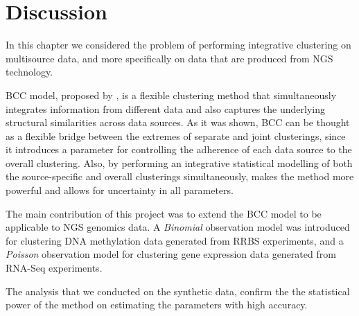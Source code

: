 \section{Discussion} \label{integr-discussion-sect}
In this chapter we considered the problem of performing integrative clustering on multisource data, and more specifically on data that are produced from NGS technology.

BCC model, proposed by \citet{Lock2013}, is a flexible clustering method that simultaneously integrates information from different data and also captures the underlying structural similarities across data sources. As it was shown, BCC can be thought as a flexible bridge between the extremes of separate and joint clusterings, since it introduces a parameter for controlling the adherence of each data source to the overall clustering. Also, by performing an integrative statistical modelling of both the source-specific and overall clusterings simultaneously, makes the method more powerful and allows for uncertainty in all parameters.

The main contribution of this project was to extend the BCC model to be applicable to NGS genomics data. A \emph{Binomial} observation model was introduced for clustering DNA methylation data generated from RRBS experiments, and a \emph{Poisson} observation model for clustering gene expression data generated from RNA-Seq experiments. 

The analysis that we conducted on the synthetic data, confirm the the statistical power of the method on estimating the parameters with high accuracy. 



